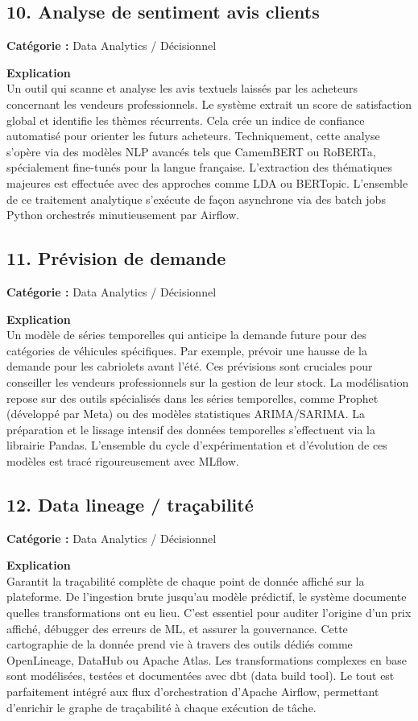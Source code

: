 \documentclass[11pt,a4paper]{article}
\begin{document}
\subsection{10. Analyse de sentiment avis clients}
\textbf{Catégorie :} Data Analytics / Décisionnel

\textbf{Explication}\\
Un outil qui scanne et analyse les avis textuels laissés par les acheteurs concernant les vendeurs professionnels. Le système extrait un score de satisfaction global et identifie les thèmes récurrents. Cela crée un indice de confiance automatisé pour orienter les futurs acheteurs. Techniquement, cette analyse s'opère via des modèles NLP avancés tels que CamemBERT ou RoBERTa, spécialement fine-tunés pour la langue française. L'extraction des thématiques majeures est effectuée avec des approches comme LDA ou BERTopic. L'ensemble de ce traitement analytique s'exécute de façon asynchrone via des batch jobs Python orchestrés minutieusement par Airflow.

\subsection{11. Prévision de demande}
\textbf{Catégorie :} Data Analytics / Décisionnel

\textbf{Explication}\\
Un modèle de séries temporelles qui anticipe la demande future pour des catégories de véhicules spécifiques. Par exemple, prévoir une hausse de la demande pour les cabriolets avant l'été. Ces prévisions sont cruciales pour conseiller les vendeurs professionnels sur la gestion de leur stock. La modélisation repose sur des outils spécialisés dans les séries temporelles, comme Prophet (développé par Meta) ou des modèles statistiques ARIMA/SARIMA. La préparation et le lissage intensif des données temporelles s'effectuent via la librairie Pandas. L'ensemble du cycle d'expérimentation et d'évolution de ces modèles est tracé rigoureusement avec MLflow.

\subsection{12. Data lineage / traçabilité}
\textbf{Catégorie :} Data Analytics / Décisionnel

\textbf{Explication}\\
Garantit la traçabilité complète de chaque point de donnée affiché sur la plateforme. De l'ingestion brute jusqu'au modèle prédictif, le système documente quelles transformations ont eu lieu. C'est essentiel pour auditer l'origine d'un prix affiché, débugger des erreurs de ML, et assurer la gouvernance. Cette cartographie de la donnée prend vie à travers des outils dédiés comme OpenLineage, DataHub ou Apache Atlas. Les transformations complexes en base sont modélisées, testées et documentées avec dbt (data build tool). Le tout est parfaitement intégré aux flux d'orchestration d'Apache Airflow, permettant d'enrichir le graphe de traçabilité à chaque exécution de tâche.
\end{document}
